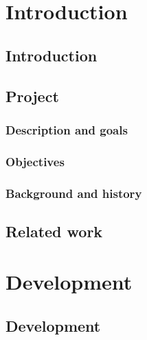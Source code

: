 \documentclass[BSP,english,oneside]{classes/gucthesis}
\begin{document}


\makefrontpages



\tableofcontents
\listoffigures
\listoftables
\newpage
\setcounter{page}{1}
\part{Introduction}
	
	\chapter{Introduction}
	\label{chap:introduction}
	

	\chapter{Project}
		\label{chap:project}

		\section{Description and goals}
		

		\section{Objectives}
		

		\section{Background and history}
		

	\chapter{Related work}
	\label{chap:related_work}
	

\part{Development}

	\chapter{Development}
		\label{chap:development}
\end{document}
